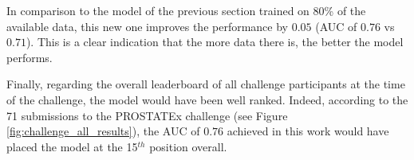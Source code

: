 In comparison to the model of the previous section trained on 80\% of the available data, this new one improves the performance by $0.05$ (AUC of $0.76$ vs $0.71$). This is a clear indication that the more data there is, the better the model performs.

Finally, regarding the overall leaderboard of all challenge participants at the time of the challenge, the model would have been well ranked. Indeed, according to the 71 submissions to the PROSTATEx challenge (see Figure \ref{fig:challenge_all_results}), the AUC of $0.76$ achieved in this work would have placed the model at the 15$^{th}$ position overall.
